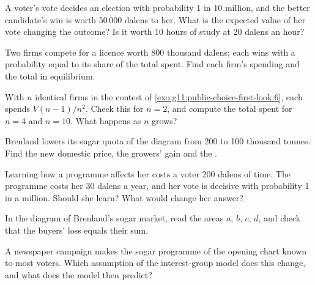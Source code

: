 \begin{exercise}[$\star$]\label{exo:g11:public-choice-first-look:5}
A voter's vote decides an election with probability 1 in 10 million, and the better candidate's win is worth 50\,000 dalens to her. What is the expected value of her
vote changing the outcome? Is it worth 10 hours of study at 20 dalens an hour?
\end{exercise}

\begin{exercise}[$\star\star$]\label{exo:g11:public-choice-first-look:6}
Two firms compete for a licence worth 800 thousand dalens; each wins with a probability equal to its share of the total spent. Find each firm's spending and the total in
equilibrium.
\end{exercise}

\begin{exercise}[$\star\star$]\label{exo:g11:public-choice-first-look:7}
With $n$ identical firms in the contest of \cref{exo:g11:public-choice-first-look:6}, each spends $V(n-1)/n^2$. Check this for $n = 2$, and compute the total spent for
$n = 4$ and $n = 10$. What happens as $n$ grows?
\end{exercise}

\begin{exercise}[$\star\star$]\label{exo:g11:public-choice-first-look:8}
Brenland lowers its sugar quota of the diagram from 200 to 100 thousand tonnes. Find the new domestic price, the growers' gain and the .
\end{exercise}

\begin{exercise}[$\star\star$]\label{exo:g11:public-choice-first-look:9}
Learning how a programme affects her costs a voter 200 dalens of time. The programme costs her 30 dalens a year, and her vote is decisive with probability 1 in a million.
Should she learn? What would change her answer?
\end{exercise}

\begin{exercise}[$\star\star$]\label{exo:g11:public-choice-first-look:10}
In the diagram of Brenland's sugar market, read the areas $a$, $b$, $c$, $d$, and check that the buyers' loss equals their sum.
\end{exercise}

\begin{exercise}[$\star\star$]\label{exo:g11:public-choice-first-look:11}
A newspaper campaign makes the sugar programme of the opening chart known to most voters. Which assumption of the interest-group model does this change, and what does the
model then predict?
\end{exercise}

